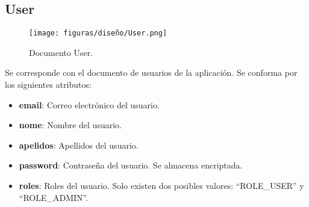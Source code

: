 \subsection{User}

\begin{figure}[H]
\centerline{\texttt{[image: figuras/diseño/User.png]}}
\caption{Documento User.}
\label{enlaceUser}
\end{figure}

Se corresponde con el documento de usuarios de la aplicación. Se conforma por los siguientes atributos:

\begin{itemize}
    \item {\bf email}: Correo electrónico del usuario.
    \item {\bf nome}: Nombre del usuario.
    \item {\bf apelidos}: Apellidos del usuario.
    \item {\bf password}: Contraseña del usuario. Se almacena encriptada.
    \item {\bf roles}: Roles del usuario. Solo existen dos posibles valores: ``ROLE\_USER'' y ``ROLE\_ADMIN''.
\end{itemize}
